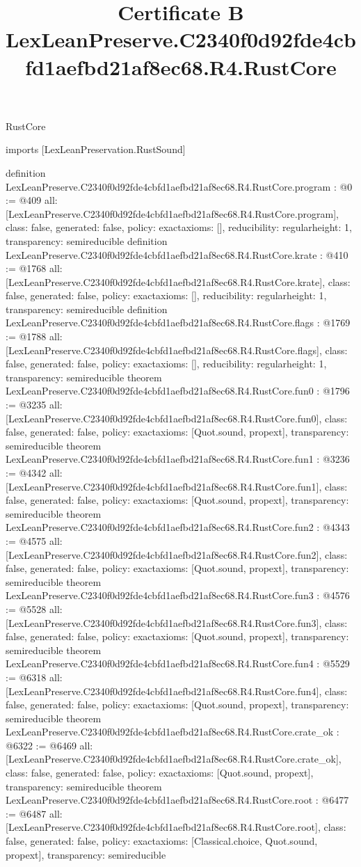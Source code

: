 \begin{lexlean}{RustCore}
\title{Certificate B LexLeanPreserve.C2340f0d92fde4cbfd1aefbd21af8ec68.R4.RustCore}
\begin{coremodule}
imports [LexLeanPreservation.RustSound]

definition LexLeanPreserve.C2340f0d92fde4cbfd1aefbd21af8ec68.R4.RustCore.program : @0 := @409 {
  all: [LexLeanPreserve.C2340f0d92fde4cbfd1aefbd21af8ec68.R4.RustCore.program],
  class: false,
  generated: false,
  policy: exact{axioms: []},
  reducibility: regular{height: 1},
  transparency: semireducible
}
definition LexLeanPreserve.C2340f0d92fde4cbfd1aefbd21af8ec68.R4.RustCore.krate : @410 := @1768 {
  all: [LexLeanPreserve.C2340f0d92fde4cbfd1aefbd21af8ec68.R4.RustCore.krate],
  class: false,
  generated: false,
  policy: exact{axioms: []},
  reducibility: regular{height: 1},
  transparency: semireducible
}
definition LexLeanPreserve.C2340f0d92fde4cbfd1aefbd21af8ec68.R4.RustCore.flags : @1769 := @1788 {
  all: [LexLeanPreserve.C2340f0d92fde4cbfd1aefbd21af8ec68.R4.RustCore.flags],
  class: false,
  generated: false,
  policy: exact{axioms: []},
  reducibility: regular{height: 1},
  transparency: semireducible
}
theorem LexLeanPreserve.C2340f0d92fde4cbfd1aefbd21af8ec68.R4.RustCore.fun0 : @1796 := @3235 {
  all: [LexLeanPreserve.C2340f0d92fde4cbfd1aefbd21af8ec68.R4.RustCore.fun0],
  class: false,
  generated: false,
  policy: exact{axioms: [Quot.sound, propext]},
  transparency: semireducible
}
theorem LexLeanPreserve.C2340f0d92fde4cbfd1aefbd21af8ec68.R4.RustCore.fun1 : @3236 := @4342 {
  all: [LexLeanPreserve.C2340f0d92fde4cbfd1aefbd21af8ec68.R4.RustCore.fun1],
  class: false,
  generated: false,
  policy: exact{axioms: [Quot.sound, propext]},
  transparency: semireducible
}
theorem LexLeanPreserve.C2340f0d92fde4cbfd1aefbd21af8ec68.R4.RustCore.fun2 : @4343 := @4575 {
  all: [LexLeanPreserve.C2340f0d92fde4cbfd1aefbd21af8ec68.R4.RustCore.fun2],
  class: false,
  generated: false,
  policy: exact{axioms: [Quot.sound, propext]},
  transparency: semireducible
}
theorem LexLeanPreserve.C2340f0d92fde4cbfd1aefbd21af8ec68.R4.RustCore.fun3 : @4576 := @5528 {
  all: [LexLeanPreserve.C2340f0d92fde4cbfd1aefbd21af8ec68.R4.RustCore.fun3],
  class: false,
  generated: false,
  policy: exact{axioms: [Quot.sound, propext]},
  transparency: semireducible
}
theorem LexLeanPreserve.C2340f0d92fde4cbfd1aefbd21af8ec68.R4.RustCore.fun4 : @5529 := @6318 {
  all: [LexLeanPreserve.C2340f0d92fde4cbfd1aefbd21af8ec68.R4.RustCore.fun4],
  class: false,
  generated: false,
  policy: exact{axioms: [Quot.sound, propext]},
  transparency: semireducible
}
theorem LexLeanPreserve.C2340f0d92fde4cbfd1aefbd21af8ec68.R4.RustCore.crate_ok : @6322 := @6469 {
  all: [LexLeanPreserve.C2340f0d92fde4cbfd1aefbd21af8ec68.R4.RustCore.crate_ok],
  class: false,
  generated: false,
  policy: exact{axioms: [Quot.sound, propext]},
  transparency: semireducible
}
theorem LexLeanPreserve.C2340f0d92fde4cbfd1aefbd21af8ec68.R4.RustCore.root : @6477 := @6487 {
  all: [LexLeanPreserve.C2340f0d92fde4cbfd1aefbd21af8ec68.R4.RustCore.root],
  class: false,
  generated: false,
  policy: exact{axioms: [Classical.choice, Quot.sound, propext]},
  transparency: semireducible
}


\end{coremodule}
\end{lexlean}
